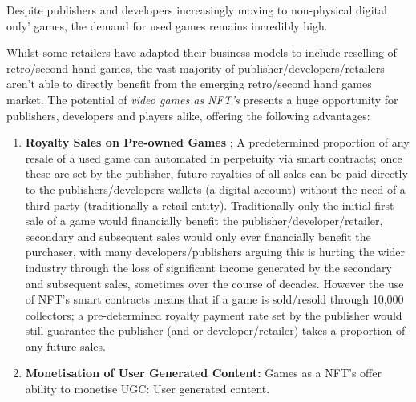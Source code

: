 Despite publishers and developers increasingly moving to non-physical
digital only' games, the demand for used games remains incredibly high.

Whilst some retailers have adapted their business models to include
reselling of retro/second hand games, the vast majority of
publisher/developers/retailers aren't able to directly benefit from the
emerging retro/second hand games market. The potential of \emph{video
games as NFT's} presents a huge opportunity for publishers, developers
and players alike, offering the following advantages:

\begin{enumerate}
\def\labelenumi{\alph{enumi}.}
\item
  \textbf{Royalty Sales on Pre-owned Games} ; A predetermined proportion
  of any resale of a used game can automated in perpetuity via smart
  contracts; once these are set by the publisher, future royalties of
  all sales can be paid directly to the publishers/developers wallets (a
  digital account) without the need of a third party (traditionally a
  retail entity). Traditionally only the initial first sale of a game
  would financially benefit the publisher/developer/retailer, secondary
  and subsequent sales would only ever financially benefit the
  purchaser, with many developers/publishers arguing this is hurting the
  wider industry through the loss of significant income generated by the
  secondary and subsequent sales, sometimes over the course of decades.
  However the use of NFT's smart contracts means that if a game is
  sold/resold through 10,000 collectors; a pre-determined royalty
  payment rate set by the publisher would still guarantee the publisher
  (and or developer/retailer) takes a proportion of any future sales.
\item
  \textbf{Monetisation of User Generated Content:} Games as a NFT's
  offer ability to monetise UGC: User generated content.
\end{enumerate}


